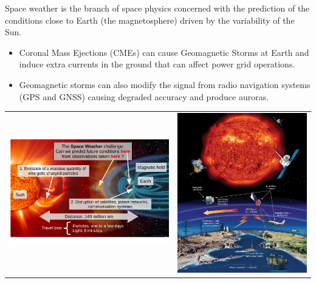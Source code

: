 \documentclass[landscape,a0b,final]{a0poster}
\newcommand{\mycaption}[1]{
  \vspace{0.5cm}
  \begin{quote}
    {{\sc Figure} \arabic{figure}: #1}
  \end{quote}
  \vspace{1cm}
  \stepcounter{figure}
}
\newcommand{\mysection}[1]
{
\begin{center}
  \begin{tikzpicture}
    \node[mysection,white] {\sffamily\bfseries\LARGE#1};
  \end{tikzpicture}
\end{center}
}
\newenvironment{poster}{
  \begin{center}
  \begin{minipage}[c]{0.85\textwidth}
}{
  \end{minipage} 
  \end{center}
}
\begin{document}
\begin{poster}
\vspace{2\baselineskip}

%
%



%
%

\large


Space weather is the branch of space physics concerned with the prediction of the  conditions close to Earth (the magnetosphere) driven by the variability of the Sun. 
\begin{itemize}
\item Coronal Mass Ejections (CMEs) can cause Geomagnetic Storms at Earth and induce extra currents in the ground that can affect power grid operations.
\item Geomagnetic storms can also modify the signal from radio navigation systems (GPS and GNSS) causing degraded accuracy and produce auroras. 
\end{itemize}

\vspace{\baselineskip}

\begin{tabular}{lr}
\includegraphics[width=0.48\hsize]{magnetosphere_shifted} &
\hspace{9cm}
\includegraphics[width=0.28\hsize]{nasa-space-weather}\\
\end{tabular}


\end{poster}
\end{document}
